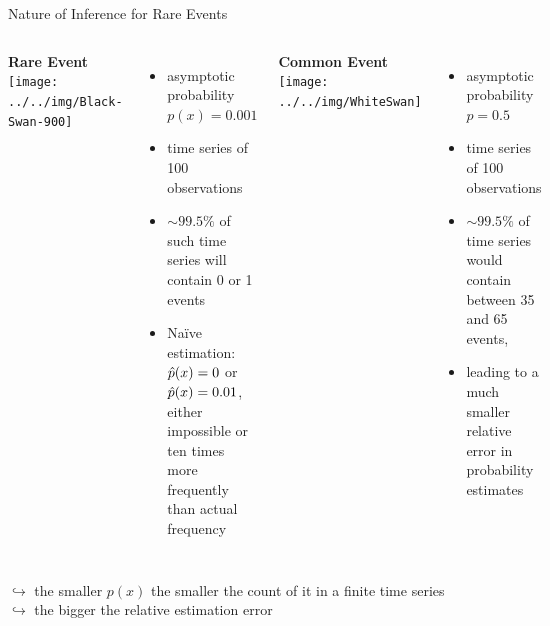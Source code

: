 \begin{frame}{Nature of Inference for Rare Events}
\begin{columns}[T]
\textbf{Rare Event} \hfill \texttt{[image: ../../img/Black-Swan-900]} \hfill
\begin{itemize}
  \item asymptotic probability $p(x) = 0.001$
  \item time series of 100 observations
  \item $\sim 99.5\%$ of such time series will contain 0 or 1 events
  \item Na\"ive estimation: $\hat{p}(x) = 0$ or $\hat{p}(x)=0.01$, \ie either impossible or ten times more frequently than actual frequency
\end{itemize}
\textbf{Common Event} \hfill \texttt{[image: ../../img/WhiteSwan]}  \hfill
\begin{itemize}
  \item asymptotic probability $p=0.5$
  \item time series of 100 observations
  \item $\sim 99.5\%$ of time series would contain between 35 and 65 events,
  \item leading to a much smaller relative error in probability estimates
\end{itemize}
\end{columns}
\vspace{2em}
$\hookrightarrow$ the smaller $p(x)$ the smaller the count of it in a finite time series \\
$\hookrightarrow$ the bigger the relative estimation error
\end{frame}

